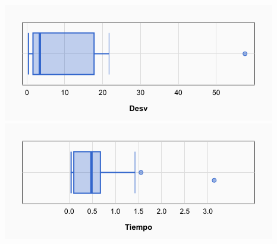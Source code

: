 \documentclass[a4paper, 12pt]{article}
\begin{document}
\begin{center}
         \includegraphics[scale=0.5]{boxplot-am(1-1)-desv}
         \includegraphics[scale=0.5]{boxplot-am(1-1)-time}
      \end{center}
      
      
      
      \newpage
\end{document}
